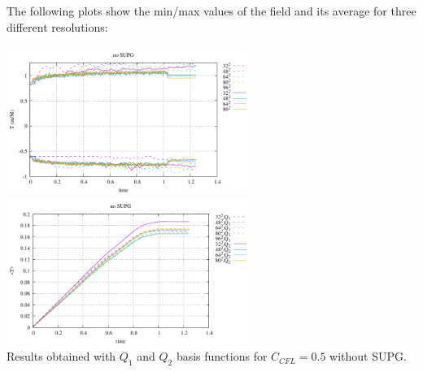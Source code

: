 The following plots show the min/max values of the field and its average for three
different resolutions:
\begin{center}
\includegraphics[width=8cm]{python_codes/fieldstone_43/results/experiment9/stats_T.pdf}
\includegraphics[width=8cm]{python_codes/fieldstone_43/results/experiment9/avrg_T.pdf}\\
{\captionfont Results obtained with $Q_1$ and $Q_2$ basis functions for $C_{CFL}=0.5$ without SUPG.}
\end{center}

